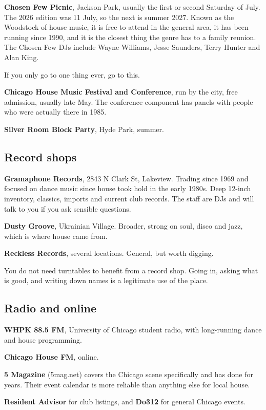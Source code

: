 \textbf{Chosen Few Picnic}, Jackson Park, usually the first or second Saturday of July. The 2026
edition was 11 July, so the next is summer 2027. Known as the Woodstock of house music, it
is free to attend in the general area, it has been running since 1990, and it is the closest
thing the genre has to a family reunion. The Chosen Few DJs include Wayne Williams, Jesse
Saunders, Terry Hunter and Alan King.

If you only go to one thing ever, go to this.

\textbf{Chicago House Music Festival and Conference}, run by the city, free admission, usually
late May. The conference component has panels with people who were actually there in 1985.

\textbf{Silver Room Block Party}, Hyde Park, summer.

\subsection{Record shops}\label{li02_scene-record-shops}

\textbf{Gramaphone Records}, 2843 N Clark St, Lakeview. Trading since 1969 and focused on dance
music since house took hold in the early 1980s. Deep 12-inch inventory, classics, imports and
current club records. The staff are DJs and will talk to you if you ask sensible questions.

\textbf{Dusty Groove}, Ukrainian Village. Broader, strong on soul, disco and jazz, which is where
house came from.

\textbf{Reckless Records}, several locations. General, but worth digging.

You do not need turntables to benefit from a record shop. Going in, asking what is good, and
writing down names is a legitimate use of the place.

\subsection{Radio and online}\label{li02_scene-radio-and-online}

\textbf{WHPK 88.5 FM}, University of Chicago student radio, with long-running dance and house
programming.

\textbf{Chicago House FM}, online.

\textbf{5 Magazine} (5mag.net) covers the Chicago scene specifically and has done for years. Their
event calendar is more reliable than anything else for local house.

\textbf{Resident Advisor} for club listings, and \textbf{Do312} for general Chicago events.

